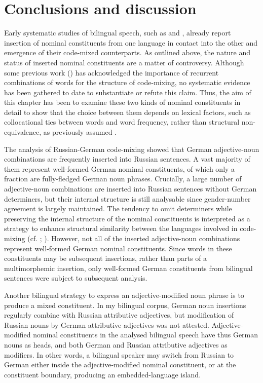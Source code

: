 \section{Conclusions and discussion}\label{sec:conclusions AN}

Early systematic studies of bilingual speech, such as \citet{pfaff-1979} and \citet{poplack-sometimes-1980}, already report insertion of nominal constituents from one language in contact into the other and emergence of their code-mixed counterparts. As outlined above, the nature and status of inserted nominal constituents are a matter of controversy. Although some previous work (\citealt{backus-two-1996, boumans-syntax-1998}) has acknowledged the importance of recurrent combinations of words for the structure of code-mixing, no systematic evidence has been gathered to date to substantiate or refute this claim. Thus, the aim of this chapter has been to examine these two kinds of nominal constituents in detail to show that the choice between them depends on lexical factors, such as collocational ties between words and word frequency, rather than structural non-equivalence, as previously assumed \citep{myers-scotton-matching-1995,myers-scotton-contact-2002}.

The analysis of Russian-German code-mixing showed that German adjective-noun combinations are frequently inserted into Russian sentences. A vast majority of them represent well-formed German nominal constituents, of which only a fraction are fully-fledged German noun phrases. Crucially, a large number of adjective-noun combinations are inserted into Russian sentences without German determiners, but their internal structure is still analysable since gender-number agreement is largely maintained. The tendency to omit determiners while preserving the internal structure of the nominal constituents is interpreted as a strategy to enhance structural similarity between the languages involved in code-mixing (cf. \citealt[][]{hakimov-backus-20-intro};  \citealt[][]{sebba-09}). However, not all of the inserted adjective-noun combinations represent well-formed German nominal constituents. Since words in these constituents may be subsequent insertions, rather than parts of a multimorphemic insertion, only well-formed German constituents from bilingual sentences were subject to subsequent analysis. 

Another bilingual strategy to express an adjective-modified noun phrase is to produce a mixed constituent. In my bilingual corpus, German noun insertions regularly combine with Russian attributive adjectives, but modification of Russian nouns by German attributive adjectives was not attested. Adjective-modified nominal constituents in the analysed bilingual speech have thus German nouns as heads, and both German and Russian attributive adjectives as modifiers. In other words, a bilingual speaker may switch from Russian to German either inside the adjective-modified nominal constituent, or at the constituent boundary,  producing an embedded-language island.


